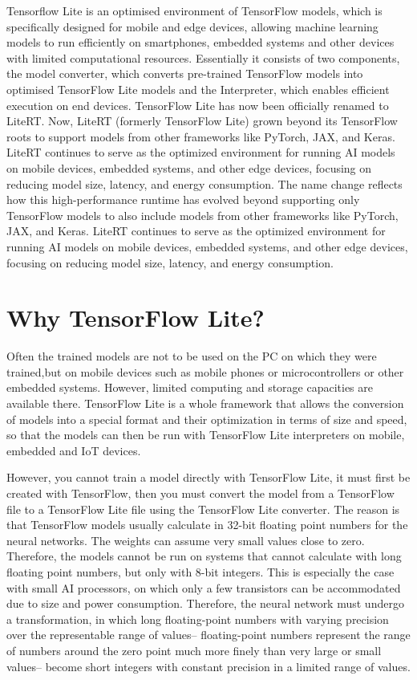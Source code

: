 Tensorflow Lite is an optimised environment of TensorFlow models, which is specifically designed for mobile and edge devices, allowing machine learning models to run efficiently on smartphones, embedded systems and other devices with limited computational resources.
Essentially it consists of two components, the model converter, which converts pre-trained TensorFlow models into optimised TensorFlow Lite models and the Interpreter, which enables efficient execution on end devices. \cite{tensorflow_lite:2024} 
\medskip
TensorFlow Lite has now been officially renamed to LiteRT. Now, LiteRT (formerly TensorFlow Lite) grown beyond its TensorFlow roots to support models from other frameworks like PyTorch, JAX, and Keras. LiteRT continues to serve as the optimized environment for running AI models on mobile devices, embedded systems, and other edge devices, focusing on reducing model size, latency, and energy consumption.
The name change reflects how this high-performance runtime has evolved beyond supporting only TensorFlow models to also include models from other frameworks like PyTorch, JAX, and Keras. LiteRT continues to serve as the optimized environment for running AI models on mobile devices, embedded systems, and other edge devices, focusing on reducing model size, latency, and energy consumption. \cite{9to5google_LiteRT:2024}

\section{Why TensorFlow Lite?}
Often the trained models are not to be used on the PC on which they were trained,but on mobile devices such as mobile phones or microcontrollers or other embedded systems. However, limited computing and storage capacities are available there. TensorFlow Lite is a whole framework that allows the conversion of models into a special format and their optimization in terms of size and speed, so that the models can then be run with TensorFlow Lite interpreters on mobile, embedded and IoT devices. \cite{tfl_guide:2024}

However, you cannot train a model directly with TensorFlow Lite, it must first be created with TensorFlow, then you must convert the model from a TensorFlow file to a TensorFlow Lite file using the TensorFlow Lite converter. The reason is that TensorFlow models usually calculate in 32-bit floating point numbers for the neural networks. The weights can assume very small values close to zero. Therefore, the models cannot be run on systems that cannot calculate with long floating point numbers, but only with 8-bit integers. This is especially the case with small AI processors, on which only a few transistors can be accommodated due to size and power consumption. Therefore, the neural network must undergo a transformation, in which long floating-point numbers with varying precision over the representable range of values– floating-point numbers represent the range of numbers around the zero point much more finely than very large or small values– become short integers with constant precision in a limited range of values. \cite{coral_ai}



